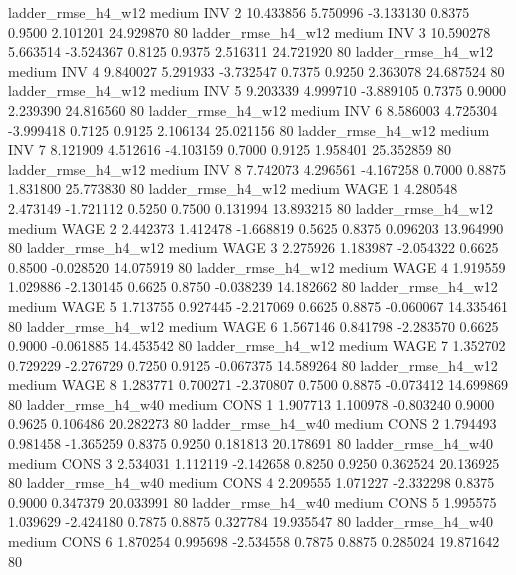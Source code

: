     ladder_rmse_h4_w12     medium      INV                 2 10.433856 5.750996 -3.133130 0.8375 0.9500  2.101201   24.929870 80
    ladder_rmse_h4_w12     medium      INV                 3 10.590278 5.663514 -3.524367 0.8125 0.9375  2.516311   24.721920 80
    ladder_rmse_h4_w12     medium      INV                 4  9.840027 5.291933 -3.732547 0.7375 0.9250  2.363078   24.687524 80
    ladder_rmse_h4_w12     medium      INV                 5  9.203339 4.999710 -3.889105 0.7375 0.9000  2.239390   24.816560 80
    ladder_rmse_h4_w12     medium      INV                 6  8.586003 4.725304 -3.999418 0.7125 0.9125  2.106134   25.021156 80
    ladder_rmse_h4_w12     medium      INV                 7  8.121909 4.512616 -4.103159 0.7000 0.9125  1.958401   25.352859 80
    ladder_rmse_h4_w12     medium      INV                 8  7.742073 4.296561 -4.167258 0.7000 0.8875  1.831800   25.773830 80
    ladder_rmse_h4_w12     medium     WAGE                 1  4.280548 2.473149 -1.721112 0.5250 0.7500  0.131994   13.893215 80
    ladder_rmse_h4_w12     medium     WAGE                 2  2.442373 1.412478 -1.668819 0.5625 0.8375  0.096203   13.964990 80
    ladder_rmse_h4_w12     medium     WAGE                 3  2.275926 1.183987 -2.054322 0.6625 0.8500 -0.028520   14.075919 80
    ladder_rmse_h4_w12     medium     WAGE                 4  1.919559 1.029886 -2.130145 0.6625 0.8750 -0.038239   14.182662 80
    ladder_rmse_h4_w12     medium     WAGE                 5  1.713755 0.927445 -2.217069 0.6625 0.8875 -0.060067   14.335461 80
    ladder_rmse_h4_w12     medium     WAGE                 6  1.567146 0.841798 -2.283570 0.6625 0.9000 -0.061885   14.453542 80
    ladder_rmse_h4_w12     medium     WAGE                 7  1.352702 0.729229 -2.276729 0.7250 0.9125 -0.067375   14.589264 80
    ladder_rmse_h4_w12     medium     WAGE                 8  1.283771 0.700271 -2.370807 0.7500 0.8875 -0.073412   14.699869 80
    ladder_rmse_h4_w40     medium     CONS                 1  1.907713 1.100978 -0.803240 0.9000 0.9625  0.106486   20.282273 80
    ladder_rmse_h4_w40     medium     CONS                 2  1.794493 0.981458 -1.365259 0.8375 0.9250  0.181813   20.178691 80
    ladder_rmse_h4_w40     medium     CONS                 3  2.534031 1.112119 -2.142658 0.8250 0.9250  0.362524   20.136925 80
    ladder_rmse_h4_w40     medium     CONS                 4  2.209555 1.071227 -2.332298 0.8375 0.9000  0.347379   20.033991 80
    ladder_rmse_h4_w40     medium     CONS                 5  1.995575 1.039629 -2.424180 0.7875 0.8875  0.327784   19.935547 80
    ladder_rmse_h4_w40     medium     CONS                 6  1.870254 0.995698 -2.534558 0.7875 0.8875  0.285024   19.871642 80
